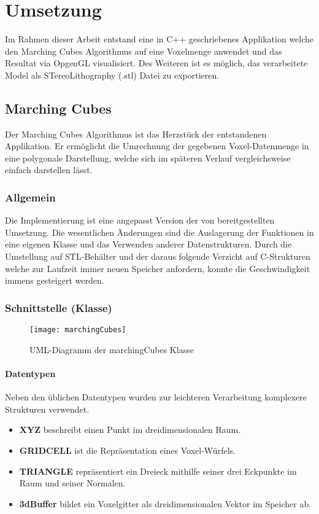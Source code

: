 \chapter{Umsetzung}
Im Rahmen dieser Arbeit entstand eine in C++ geschriebenes Applikation welche den Marching Cubes Algorithmus auf eine Voxelmenge anwendet und das Resultat via OpgenGL visualisiert. Des Weiteren ist es möglich, das verarbeitete Model als STereoLithography (.stl) Datei zu exportieren.
\section{Marching Cubes}
\label{sec:mcUms}
Der Marching Cubes Algorithmus ist das Herzstück der entstandenen Applikation. Er ermöglicht die Umrechnung der gegebenen Voxel-Datenmenge in eine polygonale Darstellung, welche sich im späteren Verlauf vergleichsweise einfach darstellen lässt.
\subsection{Allgemein}
Die Implementierung ist eine angepasst Version der von \citep{BourkeMC} bereitgestellten Umsetzung. Die wesentlichen Änderungen sind die Auslagerung der Funktionen in eine eigenen Klasse und das Verwenden anderer Datenstrukturen. Durch die Umstellung auf STL-Behälter und der daraus folgende Verzicht auf C-Strukturen welche zur Laufzeit immer neuen Speicher anfordern, konnte die Geschwindigkeit immens gesteigert werden.
\subsection{Schnittstelle (Klasse)}
\begin{figure}[H]
	\centering
	\texttt{[image: marchingCubes]}
	\caption{UML-Diagramm der marchingCubes Klasse}
	\label{fig:marchingCubes}
\end{figure}

\subsubsection{Datentypen}
Neben den üblichen Datentypen wurden zur leichteren Verarbeitung komplexere Strukturen verwendet.\\
\begin{itemize}
	\item \textbf{XYZ} beschreibt einen Punkt im dreidimensionalen Raum.
	\item \textbf{GRIDCELL} ist die Repräsentation eines Voxel-Würfels. 
	\item \textbf{TRIANGLE} repräsentiert ein Dreieck mithilfe seiner drei Eckpunkte im Raum und seiner Normalen.
	\item \textbf{3dBuffer} bildet ein Voxelgitter als dreidimensionalen Vektor im Speicher ab.
\end{itemize}

